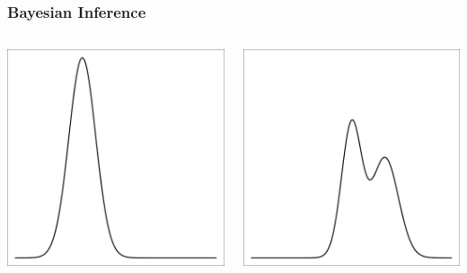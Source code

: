 \documentclass{beamer}
\begin{document}
\begin{frame}[t]
    \frametitle{Bayesian Inference}
   
    \begin{columns}[c]
            \begin{flushright}
                \includegraphics[width=1\textwidth]{bayesian_update_illustration_th1.pdf}
            \end{flushright}
            \begin{flushright}
                \includegraphics[width=1\textwidth]{bayesian_update_illustration_th2.pdf}

\end{flushright}
\end{columns}
\end{frame}
\end{document}
